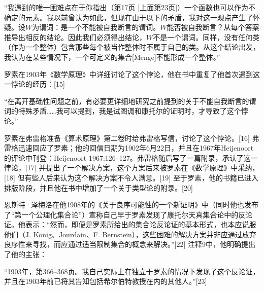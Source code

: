 “我遇到的唯一困难点在于你指出（第17页 [上面第23页]）一个函数也可以作为不确定的元素。我以前曾认为如此，但现在由于以下的矛盾，我对这一观点产生了怀疑。设\(W\)为谓词：是一个不能被自我断言的谓词。\(W\)能否被自我断言？从每个答案推导出相反的结论。因此我们必须得出结论，\(W\)不是一个谓词。同样，没有任何类（作为一个整体）包含那些每个被当作整体时不属于自己的类。从这个结论出发，我认为在某些情况下，一个可定义的集合[Menge]不能形成一个整体。”

罗素在1903年《数学原理》中详细讨论了这个悖论，他在书中重复了他首次遇到这一悖论的经历：[15]

“在离开基础性问题之前，有必要更详细地研究之前提到的关于不能自我断言的谓词的特殊矛盾……我可以提到，我是试图调和康托尔的证明时，才导致了这个悖论。”

罗素在弗雷格准备《算术原理》第二卷时给弗雷格写信，讨论了这个悖论。[16] 弗雷格迅速回应了罗素；他的回信日期为1902年6月22日，并且在1967年Heijenoort的评论中刊登：Heijenoort 1967:126–127。弗雷格随后写了一篇附录，承认了这一悖论，[17] 并提出了一个解决方案，这个方案后来被罗素在《数学原理》中采纳，[18] 但有些人后来认为这个解决方案不令人满意。[19] 至于罗素，他的书籍已进入排版阶段，并且他在书中增加了一个关于类型论的附录。[20]

恩斯特·泽梅洛在他1908年的《关于良序可能性的一个新证明》中（同时他也发布了“第一个公理化集合论”）宣称自己早于罗素发现了康托尔天真集合论中的反论证。他表示：“然而，即便是罗素所给出的集合论反论证的基本形式，也本应说服他们（J. König、Jourdain、F. Bernstein），这些困难的解决方案并非应通过放弃良序性来寻找，而应通过适当限制集合的概念来解决。”[22] 注释9中，他明确提出了他的主张：

“1903年，第366–368页。我自己实际上在独立于罗素的情况下发现了这个反论证，并且在1903年前已将其告知包括希尔伯特教授在内的其他人。”[23]

